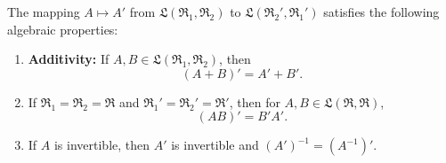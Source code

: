 The mapping $A \mapsto A'$ from $\mathfrak{L}(\mathfrak{R}_1, \mathfrak{R}_2)$ to $\mathfrak{L}(\mathfrak{R}_2', \mathfrak{R}_1')$ satisfies the following algebraic properties:

\begin{enumerate}
\item \textbf{Additivity:} If $A, B \in \mathfrak{L}(\mathfrak{R}_1, \mathfrak{R}_2)$, then
$$(A + B)' = A' + B'.$$

\item If $\mathfrak{R}_1 = \mathfrak{R}_2 = \mathfrak{R}$ and $\mathfrak{R}_1' = \mathfrak{R}_2' = \mathfrak{R}'$, then for $A, B \in \mathfrak{L}(\mathfrak{R}, \mathfrak{R})$,
$$(AB)' = B' A'.$$

\item If $A$ is invertible, then $A'$ is invertible and $(A')^{-1} = (A^{-1})'$.
\end{enumerate}
